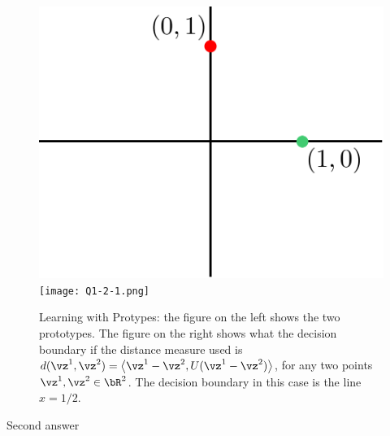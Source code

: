 \documentclass[a4paper,11pt]{article}
\begin{document}
\begin{mlsolution}
\begin{figure}[th]%
\centering
\includegraphics[width=0.3\columnwidth]{proto_blank.png}%
\hfill
\texttt{[image: Q1-2-1.png]}%
\caption{Learning with Protypes: the figure on the left shows the two prototypes. The figure on the right shows what the decision boundary if the distance measure used is $d(\vz^1,\vz^2) =\left \langle \vz^1-\vz^2, U (\vz^1-\vz^2) \right \rangle$, for any two points $\vz^1,\vz^2 \in \bR^2$. The decision boundary in this case is the line $x = 1/2$.}%
\label{fig:proto2}%
\end{figure}

\end{mlsolution}

\begin{mlsolution}
Second answer

\end{mlsolution}
\end{document}
